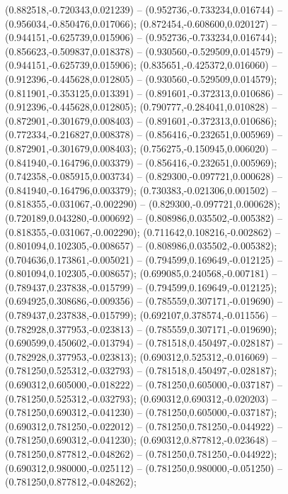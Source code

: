  (0.882518,-0.720343,0.021239) -- (0.952736,-0.733234,0.016744) -- (0.956034,-0.850476,0.017066);
 (0.872454,-0.608600,0.020127) -- (0.944151,-0.625739,0.015906) -- (0.952736,-0.733234,0.016744);
 (0.856623,-0.509837,0.018378) -- (0.930560,-0.529509,0.014579) -- (0.944151,-0.625739,0.015906);
 (0.835651,-0.425372,0.016060) -- (0.912396,-0.445628,0.012805) -- (0.930560,-0.529509,0.014579);
 (0.811901,-0.353125,0.013391) -- (0.891601,-0.372313,0.010686) -- (0.912396,-0.445628,0.012805);
 (0.790777,-0.284041,0.010828) -- (0.872901,-0.301679,0.008403) -- (0.891601,-0.372313,0.010686);
 (0.772334,-0.216827,0.008378) -- (0.856416,-0.232651,0.005969) -- (0.872901,-0.301679,0.008403);
 (0.756275,-0.150945,0.006020) -- (0.841940,-0.164796,0.003379) -- (0.856416,-0.232651,0.005969);
 (0.742358,-0.085915,0.003734) -- (0.829300,-0.097721,0.000628) -- (0.841940,-0.164796,0.003379);
 (0.730383,-0.021306,0.001502) -- (0.818355,-0.031067,-0.002290) -- (0.829300,-0.097721,0.000628);
 (0.720189,0.043280,-0.000692) -- (0.808986,0.035502,-0.005382) -- (0.818355,-0.031067,-0.002290);
 (0.711642,0.108216,-0.002862) -- (0.801094,0.102305,-0.008657) -- (0.808986,0.035502,-0.005382);
 (0.704636,0.173861,-0.005021) -- (0.794599,0.169649,-0.012125) -- (0.801094,0.102305,-0.008657);
 (0.699085,0.240568,-0.007181) -- (0.789437,0.237838,-0.015799) -- (0.794599,0.169649,-0.012125);
 (0.694925,0.308686,-0.009356) -- (0.785559,0.307171,-0.019690) -- (0.789437,0.237838,-0.015799);
 (0.692107,0.378574,-0.011556) -- (0.782928,0.377953,-0.023813) -- (0.785559,0.307171,-0.019690);
 (0.690599,0.450602,-0.013794) -- (0.781518,0.450497,-0.028187) -- (0.782928,0.377953,-0.023813);
 (0.690312,0.525312,-0.016069) -- (0.781250,0.525312,-0.032793) -- (0.781518,0.450497,-0.028187);
 (0.690312,0.605000,-0.018222) -- (0.781250,0.605000,-0.037187) -- (0.781250,0.525312,-0.032793);
 (0.690312,0.690312,-0.020203) -- (0.781250,0.690312,-0.041230) -- (0.781250,0.605000,-0.037187);
 (0.690312,0.781250,-0.022012) -- (0.781250,0.781250,-0.044922) -- (0.781250,0.690312,-0.041230);
 (0.690312,0.877812,-0.023648) -- (0.781250,0.877812,-0.048262) -- (0.781250,0.781250,-0.044922);
 (0.690312,0.980000,-0.025112) -- (0.781250,0.980000,-0.051250) -- (0.781250,0.877812,-0.048262);
